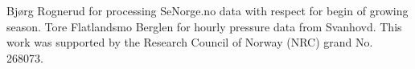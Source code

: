 \documentclass[bg, manuscript]{copernicus}
\begin{document}

\begin{acknowledgements}
  Bj{\o}rg Rognerud for processing SeNorge.no data with respect for begin of growing season.
  Tore Flatlandsmo Berglen for hourly pressure data from Svanhovd.
  This work was supported by the Research Council of Norway (NRC) grand No. 268073.
\end{acknowledgements}

















\end{document}
